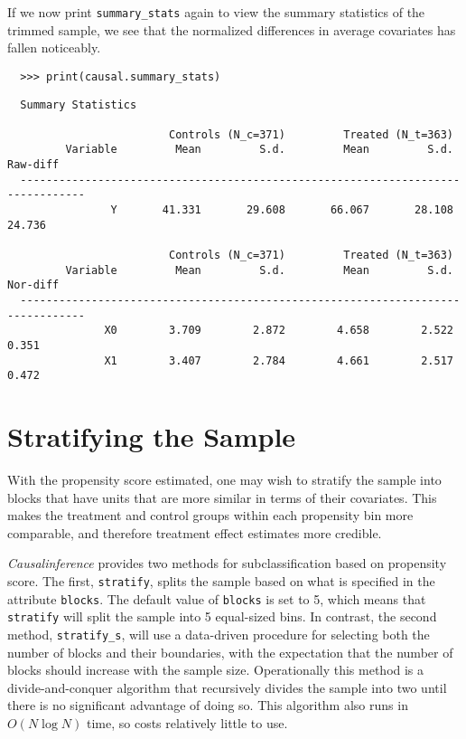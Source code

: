 \documentclass[12pt]{article}
\theoremstyle{definition}
\theoremstyle{definition}
\theoremstyle{definition}
\theoremstyle{remark}
\begin{document}
If we now print \texttt{summary\_stats} again to view the summary statistics of the trimmed sample, we see that the normalized differences in average covariates has fallen noticeably.
\begin{verbatim}
  >>> print(causal.summary_stats)
\end{verbatim}
\begin{verbatim}
  Summary Statistics
  
                         Controls (N_c=371)         Treated (N_t=363)             
         Variable         Mean         S.d.         Mean         S.d.     Raw-diff
  --------------------------------------------------------------------------------
                Y       41.331       29.608       66.067       28.108       24.736
  
                         Controls (N_c=371)         Treated (N_t=363)             
         Variable         Mean         S.d.         Mean         S.d.     Nor-diff
  --------------------------------------------------------------------------------
               X0        3.709        2.872        4.658        2.522        0.351
               X1        3.407        2.784        4.661        2.517        0.472
\end{verbatim}


\section{Stratifying the Sample} \label{sec.e}

With the propensity score estimated, one may wish to stratify the sample into blocks that have units that are more similar in terms of their covariates. This makes the treatment and control groups within each propensity bin more comparable, and therefore treatment effect estimates more credible.

\textit{Causalinference} provides two methods for subclassification based on propensity score. The first, \texttt{stratify}, splits the sample based on what is specified in the attribute \texttt{blocks}. The default value of \texttt{blocks} is set to 5, which means that \texttt{stratify} will split the sample into 5 equal-sized bins. In contrast, the second method, \texttt{stratify\_s}, will use a data-driven procedure for selecting both the number of blocks and their boundaries, with the expectation that the number of blocks should increase with the sample size. Operationally this method is a divide-and-conquer algorithm that recursively divides the sample into two until there is no significant advantage of doing so. This algorithm also runs in $O(N \log N)$ time, so costs relatively little to use. 
\end{document}
